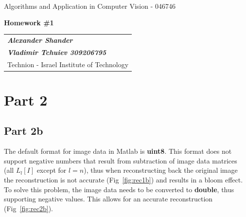 \documentclass[a4paper]{iacas}
\begin{document}
\begin{center}
 \large Algorithms and Application in Computer Vision - 046746
 \end{center}
\begin{center}
\large\textbf{Homework \#1}
 \end{center}


\begin{tabular}{l}
\\
{\bf\textit{Alexander Shander}} \\
{\bf\textit{Vladimir Tchuiev 309206795}} \\
Technion - Israel Institute of Technology
\end{tabular}

\vspace{2em}

\section{Part 2}

\subsection{Part 2b}

The default format for image data in Matlab is \textbf{uint8}. This format does not support negative numbers that result from subtraction of image data matrices (all $L_l[I]$ except for $l=n$), thus when reconstructing back the original image the reconstruction is not accurate (Fig~\ref{fig:rec1b}) and results in a bloom effect. To solve this problem, the image data needs to be converted to \textbf{double}, thus supporting negative values. This allows for an accurate reconstruction (Fig~\ref{fig:rec2b}).
\end{document}

